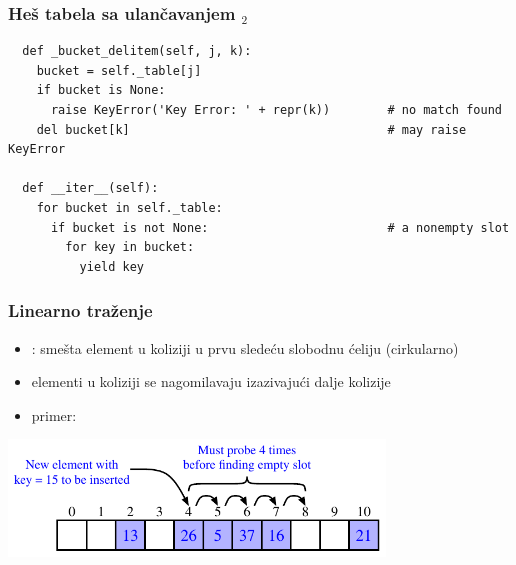 \documentclass[compress]{beamer}
\begin{document}
\begin{frame}[fragile,shrink=25]
  \frametitle{Heš tabela sa ulančavanjem $_2$}
\begin{verbatim}
  def _bucket_delitem(self, j, k):
    bucket = self._table[j]
    if bucket is None:
      raise KeyError('Key Error: ' + repr(k))        # no match found
    del bucket[k]                                    # may raise KeyError

  def __iter__(self):
    for bucket in self._table:
      if bucket is not None:                         # a nonempty slot
        for key in bucket:
          yield key
\end{verbatim}
\end{frame}

\begin{frame}[fragile]
  \frametitle{Linearno traženje}
  \begin{itemize}
    \item {}: smešta element u koliziji u prvu sledeću slobodnu ćeliju (cirkularno)
    \item elementi u koliziji se nagomilavaju izazivajući dalje kolizije
    \item primer:
  \end{itemize}
  \begin{center}
    \includegraphics[width=10cm]{asp-10-pic09.pdf}
  \end{center}
\end{frame}
\end{document}
